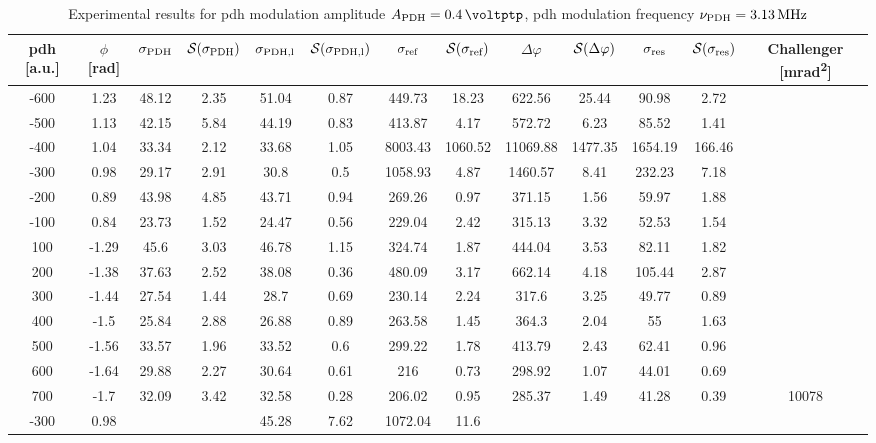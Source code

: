 \begin{landscape}
	\begin{table}
	\centering
	\begin{tabular}{|c|c|c|c|c|c|c|c|c|c|c|c|c|}
		\hline
		\gls{pdh} [a.u.] & $\phi$ [\si{\radian}] & $\sigma_{\text{PDH}}$ & $\mathcal{S}(\sigma_{\text{PDH}})$ & $\sigma_{\text{PDH,l}}$ & $\mathcal{S}(\sigma_{\text{PDH,l}})$  & $\sigma_{\text{ref}}$ & $\mathcal{S}(\sigma_{\text{ref}})$ & $\Delta \varphi$ & $\mathcal{S}(\Delta \varphi)$ & $\sigma_{\text{res}}$  & $\mathcal{S}(\sigma_{\text{res}})$ & Challenger [\si{\milli\radian\squared}] \\
		\hline
		\hline
		-600 & 1.23 & 48.12 & 2.35 & 51.04 & 0.87 & 449.73 & 18.23 & 622.56 & 25.44 & 90.98 & 2.72 & \\
		-500 & 1.13 & 42.15 & 5.84 & 44.19 & 0.83 & 413.87 & 4.17 & 572.72 & 6.23 & 85.52 & 1.41 & \\
		-400 & 1.04 & 33.34 & 2.12 & 33.68 & 1.05 & 8003.43 & 1060.52 & 11069.88 & 1477.35 & 1654.19 & 166.46 & \\
		-300 & 0.98 & 29.17 & 2.91 & 30.8 & 0.5 & 1058.93 & 4.87 & 1460.57 & 8.41 & 232.23 & 7.18 & \\
		-200 & 0.89 & 43.98 & 4.85 & 43.71 & 0.94 & 269.26 & 0.97 & 371.15 & 1.56 & 59.97 & 1.88 & \\
		-100 & 0.84 & 23.73 & 1.52 & 24.47 & 0.56 & 229.04 & 2.42 & 315.13 & 3.32 & 52.53 & 1.54 & \\
		100 & -1.29 & 45.6 & 3.03 & 46.78 & 1.15 & 324.74 & 1.87 & 444.04 & 3.53 & 82.11 & 1.82 & \\
		200 & -1.38 & 37.63 & 2.52 & 38.08 & 0.36 & 480.09 & 3.17 & 662.14 & 4.18 & 105.44 & 2.87 & \\
		300 & -1.44 & 27.54 & 1.44 & 28.7 & 0.69 & 230.14 & 2.24 & 317.6 & 3.25 & 49.77 & 0.89 & \\
		400 & -1.5 & 25.84 & 2.88 & 26.88 & 0.89 & 263.58 & 1.45 & 364.3 & 2.04 & 55 & 1.63 & \\
		500 & -1.56 & 33.57 & 1.96 & 33.52 & 0.6 & 299.22 & 1.78 & 413.79 & 2.43 & 62.41 & 0.96 & \\
		600 & -1.64 & 29.88 & 2.27 & 30.64 & 0.61 & 216 & 0.73 & 298.92 & 1.07 & 44.01 & 0.69 & \\
		700 & -1.7 & 32.09 & 3.42 & 32.58 & 0.28 & 206.02 & 0.95 & 285.37 & 1.49 & 41.28 & 0.39 & 10078\\
		\hline
		\hline
		-300 & 0.98 & & & 45.28 & 7.62 & 1072.04 & 11.6 & & & & & \\
		\hline
	\end{tabular}
	\caption{Experimental results for \gls{pdh} modulation amplitude $\tind{A}{PDH} = \SI{0.4}{\voltptp}$, \gls{pdh} modulation frequency $\nu_{\text{PDH}} = \SI{3.13}{\mega\hertz}$}
	\end{table}
	
\end{landscape}